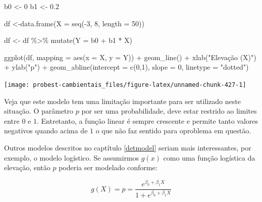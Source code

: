 \documentclass[
]{book}
\newenvironment{Shaded}{\begin{snugshade}}{\end{snugshade}}
\newcommand{\AttributeTok}[1]{\textcolor[rgb]{0.77,0.63,0.00}{#1}}
\newcommand{\DecValTok}[1]{\textcolor[rgb]{0.00,0.00,0.81}{#1}}
\newcommand{\FloatTok}[1]{\textcolor[rgb]{0.00,0.00,0.81}{#1}}
\newcommand{\FunctionTok}[1]{\textcolor[rgb]{0.00,0.00,0.00}{#1}}
\newcommand{\NormalTok}[1]{#1}
\newcommand{\OtherTok}[1]{\textcolor[rgb]{0.56,0.35,0.01}{#1}}
\newcommand{\SpecialCharTok}[1]{\textcolor[rgb]{0.00,0.00,0.00}{#1}}
\newcommand{\StringTok}[1]{\textcolor[rgb]{0.31,0.60,0.02}{#1}}
\begin{document}
\begin{Shaded}
\begin{Highlighting}[]
\NormalTok{b0 }\OtherTok{\textless{}{-}} \DecValTok{0}
\NormalTok{b1 }\OtherTok{\textless{}{-}} \FloatTok{0.2}

\NormalTok{df }\OtherTok{\textless{}{-}}\FunctionTok{data.frame}\NormalTok{(}\AttributeTok{X =} \FunctionTok{seq}\NormalTok{(}\SpecialCharTok{{-}}\DecValTok{3}\NormalTok{, }\DecValTok{8}\NormalTok{, }\AttributeTok{length =} \DecValTok{50}\NormalTok{))}

\NormalTok{df }\OtherTok{\textless{}{-}}\NormalTok{ df }\SpecialCharTok{\%\textgreater{}\%} \FunctionTok{mutate}\NormalTok{(}\AttributeTok{Y =}\NormalTok{ b0 }\SpecialCharTok{+}\NormalTok{ b1 }\SpecialCharTok{*}\NormalTok{ X)}

\FunctionTok{ggplot}\NormalTok{(df, }\AttributeTok{mapping =} \FunctionTok{aes}\NormalTok{(}\AttributeTok{x =}\NormalTok{ X, }\AttributeTok{y =}\NormalTok{ Y)) }\SpecialCharTok{+}
  \FunctionTok{geom\_line}\NormalTok{() }\SpecialCharTok{+}
  \FunctionTok{xlab}\NormalTok{(}\StringTok{"Elevação (X)"}\NormalTok{) }\SpecialCharTok{+}
  \FunctionTok{ylab}\NormalTok{(}\StringTok{"p"}\NormalTok{) }\SpecialCharTok{+}
  \FunctionTok{geom\_abline}\NormalTok{(}\AttributeTok{intercept =} \FunctionTok{c}\NormalTok{(}\DecValTok{0}\NormalTok{,}\DecValTok{1}\NormalTok{), }\AttributeTok{slope =} \DecValTok{0}\NormalTok{, }\AttributeTok{linetype =} \StringTok{"dotted"}\NormalTok{)}
\end{Highlighting}
\end{Shaded}

\begin{center}\texttt{[image: probest-cambientais\_files/figure-latex/unnamed-chunk-427-1]} \end{center}

Veja que este modelo tem uma limitação importante para ser utilizado neste situação. O parâmetro \(p\) por ser uma probabilidade, deve estar restrido ao limites entre \(0\) e \(1\). Entretanto, a função linear é sempre crescente e permite tanto valores negativos quando acima de \(1\) o que não faz sentido para oproblema em questão.

Outros modelos descritos no captítulo \ref{detmodel} seriam mais interessantes, por exemplo, o modelo logístico. Se assumirmos \(g(x)\) como uma função logística da elevação, então \(p\) poderia ser modelado conforme:

\[g(X) = p = \frac{e^{\beta_0 + \beta_1 X}}{1 + e^{\beta_0 + \beta_1 X}}\]
\end{document}
